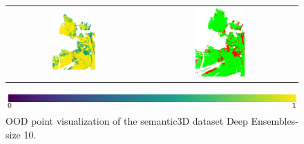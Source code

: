 \begin{figure}[h!]
\begin{tabular}{cc}
                \includegraphics[width=0.33\textwidth, height=0.18\textheight]{images/ood_imgs/fout_sem3d/fout_prob_3.png}& 
                \includegraphics[width=0.33\textwidth, height=0.18\textheight]{images/ood_imgs/fout_sem3d/fout_ood_auroc_3.png}\\
            \end{tabular}
            \includegraphics[scale=0.45]{images/prob_legend.pdf}
            \caption{OOD point visualization of the semantic3D dataset Deep Ensembles-size 10.}
            \label{fig:fout_ood_auroc_sem3d_prob}
        \end{figure}
